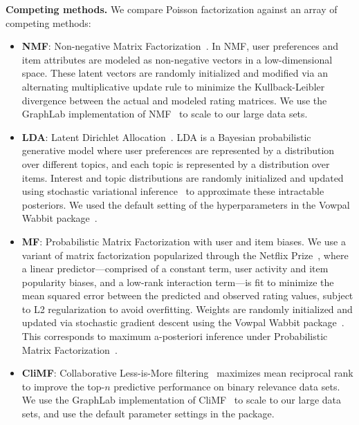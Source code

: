 {\bf Competing methods.} We compare Poisson factorization against an array of
competing methods:
\begin{itemize}
  \item {\bf NMF}: Non-negative Matrix
    Factorization~\cite{Lee:1999}. In NMF, user preferences and item
    attributes are modeled as non-negative vectors in a
    low-dimensional space. These latent vectors are randomly
    initialized and modified via an alternating multiplicative update
    rule to minimize the Kullback-Leibler divergence between the
    actual and modeled rating matrices. We use the GraphLab
    implementation of NMF~\cite{kyrola2012graphchi} to scale to our large data sets.

  \item {\bf LDA}: Latent Dirichlet Allocation~\cite{Blei:2003b}. LDA
    is a Bayesian probabilistic generative model where user preferences
    are represented by a distribution over different topics, and each
    topic is represented by a distribution over items. Interest and topic
    distributions are randomly initialized and updated using
    stochastic variational inference~\cite{Hoffman:2013} to
    approximate these intractable posteriors. We used the default
    setting of the hyperparameters in the Vowpal Wabbit package~\cite{Weinberger:2009}.

  \item {\bf MF}: Probabilistic Matrix Factorization with user and
    item biases. We use a variant of matrix factorization popularized
    through the Netflix Prize~\cite{Koren:2009}, where a linear
    predictor---comprised of a constant term, user activity and item
    popularity biases, and a low-rank interaction term---is fit to
    minimize the mean squared error between the predicted and observed
    rating values, subject to L2 regularization to avoid
    overfitting. Weights are randomly initialized and updated via
    stochastic gradient descent using the Vowpal Wabbit package~\cite{Weinberger:2009}. This
    corresponds to maximum a-posteriori inference under Probabilistic
    Matrix Factorization~\cite{Salakhutdinov:2008a}.

\item {\bf CliMF}: Collaborative Less-is-More
  filtering~\cite{shi2012climf} maximizes mean reciprocal rank to
  improve the top-$n$ predictive performance on binary relevance data
  sets. We use the GraphLab implementation of
  CliMF~\cite{kyrola2012graphchi} to scale to our large data sets, 
  and use the default parameter settings in the package.
\end{itemize}

